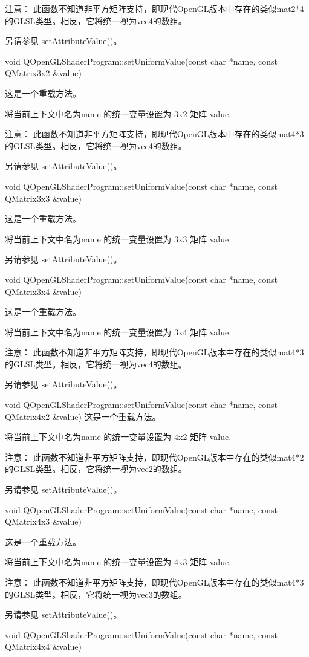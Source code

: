 注意： 此函数不知道非平方矩阵支持，即现代OpenGL版本中存在的类似mat2*4的GLSL类型。相反，它将统一视为vec4的数组。

另请参见 setAttributeValue()。

void QOpenGLShaderProgram::setUniformValue(const char *name, const QMatrix3x2 \&value)

这是一个重载方法。

将当前上下文中名为name 的统一变量设置为 3x2 矩阵 value.

注意： 此函数不知道非平方矩阵支持，即现代OpenGL版本中存在的类似mat4*3的GLSL类型。相反，它将统一视为vec4的数组。

另请参见 setAttributeValue()。

void QOpenGLShaderProgram::setUniformValue(const char *name, const QMatrix3x3 \&value)

这是一个重载方法。

将当前上下文中名为name 的统一变量设置为 3x3 矩阵 value.

另请参见 setAttributeValue()。

void QOpenGLShaderProgram::setUniformValue(const char *name, const QMatrix3x4 \&value)

这是一个重载方法。

将当前上下文中名为name 的统一变量设置为 3x4 矩阵 value.

注意： 此函数不知道非平方矩阵支持，即现代OpenGL版本中存在的类似mat4*3的GLSL类型。相反，它将统一视为vec4的数组。

另请参见 setAttributeValue()。

void QOpenGLShaderProgram::setUniformValue(const char *name, const QMatrix4x2 \&value)
这是一个重载方法。

将当前上下文中名为name 的统一变量设置为 4x2 矩阵 value.

注意： 此函数不知道非平方矩阵支持，即现代OpenGL版本中存在的类似mat4*2的GLSL类型。相反，它将统一视为vec2的数组。

另请参见 setAttributeValue()。

void QOpenGLShaderProgram::setUniformValue(const char *name, const QMatrix4x3 \&value)

这是一个重载方法。

将当前上下文中名为name 的统一变量设置为 4x3 矩阵 value.

注意： 此函数不知道非平方矩阵支持，即现代OpenGL版本中存在的类似mat4*3的GLSL类型。相反，它将统一视为vec3的数组。

另请参见 setAttributeValue()。

void QOpenGLShaderProgram::setUniformValue(const char *name, const QMatrix4x4 \&value)


